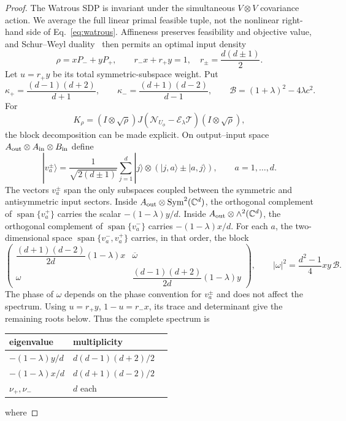 \documentclass[11pt,a4paper]{article}
\theoremstyle{remark}
\newcommand{\cE}{\mathcal{E}}
\newcommand{\cN}{\mathcal{N}}
\newcommand{\cT}{\mathcal{T}}
\begin{document}
\begin{proof}
The Watrous SDP is invariant under the simultaneous $V\otimes V$ covariance
action.  We average the full linear primal feasible tuple, not the nonlinear
right-hand side of Eq.~\eqref{eq:watrous}.  Affineness preserves feasibility
and objective value, and Schur--Weyl duality~\cite{watrous2018} then permits
an optimal input density
\[
 \rho=xP_-+yP_+,\qquad r_-x+r_+y=1,
 \quad r_\pm=\frac{d(d\pm1)}2.
\]
Let $u=r_+y$ be its total symmetric-subspace weight.  Put
\[
 \kappa_+=\frac{(d-1)(d+2)}{d+1},\qquad
 \kappa_-=\frac{(d+1)(d-2)}{d-1},\qquad
 \mathcal B=(1+\lambda)^2-4\lambda c^2.
\]
For
\[
 K_\rho=(I\otimes\sqrt\rho)
 J(\cN_{U_\phi}-\cE_\lambda\cT)
 (I\otimes\sqrt\rho),
\]
the block decomposition can be made explicit.  On output--input space
$A_{\rm out}\otimes A_{\rm in}\otimes B_{\rm in}$ define
\[
 |v_a^\pm\rangle=
 \frac{1}{\sqrt{2(d\pm1)}}\sum_{j=1}^d
 |j\rangle\otimes
 (|j,a\rangle\pm|a,j\rangle),\qquad a=1,\ldots,d.
\]
The vectors $v_a^\pm$ span the only subspaces coupled between the symmetric
and antisymmetric input sectors.  Inside
$A_{\rm out}\otimes\operatorname{Sym}^2(\mathbb C^d)$, the
orthogonal complement of $\operatorname{span}\{v_a^+\}$ carries the scalar
$-(1-\lambda)y/d$.  Inside
$A_{\rm out}\otimes\wedge^2(\mathbb C^d)$, the orthogonal
complement of $\operatorname{span}\{v_a^-\}$ carries
$-(1-\lambda)x/d$.  For each $a$, the two-dimensional space
$\operatorname{span}\{v_a^-,v_a^+\}$ carries, in that order, the block
\[
 \begin{pmatrix}
  \dfrac{(d+1)(d-2)}{2d}(1-\lambda)x&\overline\omega\\[5pt]
  \omega&\dfrac{(d-1)(d+2)}{2d}(1-\lambda)y
 \end{pmatrix},
 \qquad
  |\omega|^2=\frac{d^2-1}{4}xy\,\mathcal B .
\]
The phase of $\omega$ depends on the phase convention for $v_a^\pm$ and does
not affect the spectrum.  Using $u=r_+y$, $1-u=r_-x$, its trace and determinant
give the remaining roots below.  Thus the complete spectrum is
\begin{center}
\begin{tabular}{@{}lll@{}}
\toprule
eigenvalue & multiplicity\\
\midrule
$-(1-\lambda)y/d$ & $d(d-1)(d+2)/2$\\
$-(1-\lambda)x/d$ & $d(d+1)(d-2)/2$\\
$\nu_+,\nu_-$ & $d$ each\\
\bottomrule
\end{tabular}
\end{center}
where

\end{proof}
\end{document}
